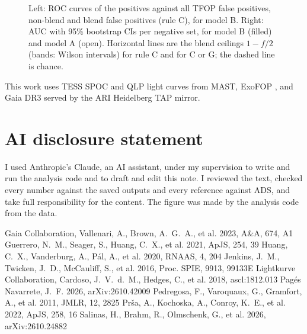 \documentclass{aastex701}
\begin{document}
\begin{figure}[ht!]
\caption{Left: ROC curves of the positives against all TFOP false positives, non-blend and blend false positives
(rule C), for model B. Right: AUC with 95\% bootstrap CIs per negative set, for model B (filled) and model A (open).
Horizontal lines are the blend ceilings $1-f/2$ (bands: Wilson intervals) for rule C and for C or G; the dashed line
is chance.\label{fig:auc}}
\end{figure}

\begin{acknowledgments}
This work uses TESS SPOC  and QLP
 light curves from MAST, ExoFOP
, and Gaia DR3 served by the ARI Heidelberg TAP
mirror.
\end{acknowledgments}



\section*{AI disclosure statement}
I used Anthropic's Claude, an AI assistant, under my supervision to write and run the analysis code and to draft and
edit this note. I reviewed the text, checked every number against the saved outputs and every reference against ADS,
and take full responsibility for the content. The figure was made by the analysis code from the data.

\begin{thebibliography}{}
 Gaia Collaboration, Vallenari, A., Brown, A.~G.~A., et al. 2023, A\&A, 674, A1
 Guerrero, N.~M., Seager, S., Huang, C.~X., et al. 2021, ApJS, 254, 39
 Huang, C.~X., Vanderburg, A., P{\'a}l, A., et al. 2020, RNAAS, 4, 204
 Jenkins, J.~M., Twicken, J.~D., McCauliff, S., et al. 2016, Proc. SPIE, 9913, 99133E
 Lightkurve Collaboration, Cardoso, J.~V.~d.~M., Hedges, C., et al. 2018, ascl:1812.013
 Pag{\'e}s Navarrete, J.~F. 2026, arXiv:2610.42009
 Pedregosa, F., Varoquaux, G., Gramfort, A., et al. 2011, JMLR, 12, 2825
 Pr{\v s}a, A., Kochoska, A., Conroy, K.~E., et al. 2022, ApJS, 258, 16
 Salinas, H., Brahm, R., Olmschenk, G., et al. 2026, arXiv:2610.24882
\end{thebibliography}
\end{document}
